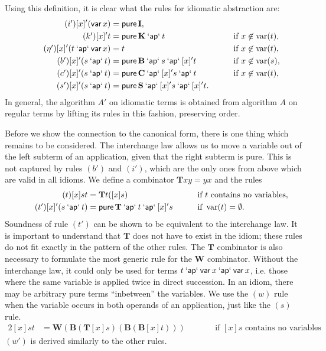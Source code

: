Using this definition, it is clear what the rules for idiomatic abstraction
are:
\begin{alignat}{2}
	\tag{$i'$} [x]'(\operatorname{\mathsf{var}} x) &= \operatorname{\mathsf{pure}} \mathbf{I}, && \\
	\tag{$k'$} [x]'t &= \operatorname{\mathsf{pure}} \mathbf{K} \mathbin{\mathsf{`ap`}} t &&\qquad\text{if } x \not\in \operatorname{var}(t), \\
	\tag{$\eta'$} [x]'(t \mathbin{\mathsf{`ap`}} \operatorname{\mathsf{var}} x) &= t &&\qquad\text{if } x \not\in\operatorname{var}(t), \\
	\tag{$b'$} [x]'(s \mathbin{\mathsf{`ap`}} t) &= \operatorname{\mathsf{pure}} \mathbf{B} \mathbin{\mathsf{`ap`}} s \mathbin{\mathsf{`ap`}} [x]'t &&\qquad\text{if } x \not\in \operatorname{var}(s), \\
	\tag{$c'$} [x]'(s \mathbin{\mathsf{`ap`}} t) &= \operatorname{\mathsf{pure}} \mathbf{C} \mathbin{\mathsf{`ap`}} [x]'s \mathbin{\mathsf{`ap`}} t &&\qquad\text{if } x \not\in \operatorname{var}(t), \\
	\tag{$s'$} [x]'(s \mathbin{\mathsf{`ap`}} t) &= \operatorname{\mathsf{pure}} \mathbf{S} \mathbin{\mathsf{`ap`}} [x]'s \mathbin{\mathsf{`ap`}} [x]'t. &&
\end{alignat}
In general, the algorithm $A'$ on idiomatic terms is obtained from algorithm
$A$ on regular terms by lifting its rules in this fashion, preserving order.

Before we show the connection to the canonical form, there is one thing which
remains to be considered.
The interchange law allows us to move a variable out of the left subterm of
an application, given that the right subterm is pure.
This is not captured by rules $(b')$ and $(i')$, which are the only ones from
above which are valid in all idioms.
We define a combinator $\mathbf{T}xy = yx$ and the rules
\begin{alignat}{2}
	\tag{$t$} [x]st &= \mathbf{T}t([x]s) &&\qquad\text{if $t$ contains no variables}, \\
	\tag{$t'$} [x]'(s \mathbin{\mathsf{`ap`}} t) &= \operatorname{\mathsf{pure}} \mathbf{T} \mathbin{\mathsf{`ap`}} t \mathbin{\mathsf{`ap`}} [x]'s
		&&\qquad\text{if } \operatorname{var}(t) = \emptyset.
\end{alignat}
Soundness of rule $(t')$ can be shown to be equivalent to the interchange law.
It is important to understand that $\mathbf{T}$ does not have to exist in the
idiom; these rules do not fit exactly in the pattern of the other rules.
The $\mathbf{T}$ combinator is also necessary to formulate the most generic
rule for the $\mathbf{W}$ combinator.
Without the interchange law, it could only be used for terms
$t \mathbin{\mathsf{`ap`}} \operatorname{\mathsf{var}} x \mathbin{\mathsf{`ap`}} \operatorname{\mathsf{var}} x$, i.e. those where the same variable is applied
twice in direct succession.
In an idiom, there may be arbitrary pure terms ``inbetween'' the variables.
We use the $(w)$ rule when the variable occurs in both operands of an application,
just like the $(s)$ rule.
\begin{alignat}{2}
	\tag{$w$} [x]st &= \mathbf{W}(\mathbf{B}(\mathbf{T}[x]s)(\mathbf{B}(\mathbf{B}[x]t)))
		&&\qquad\text{if $[x]s$ contains no variables}.
\end{alignat}
$(w')$ is derived similarly to the other rules.

